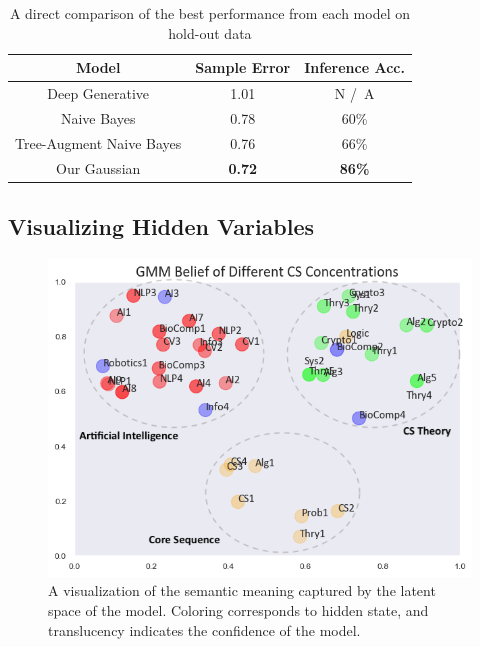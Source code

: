 \documentclass{edm_template}
\begin{document}
\begin{table}
    \centering
    \begin{tabular}{|c|c|c|}
    \hline
    Model & Sample Error & Inference Acc. \\
    \hline
    Deep Generative & 1.01 & N /\ A \\
    Naive Bayes & 0.78 & 60\% \\
    Tree-Augment Naive Bayes & 0.76 & 66\% \\
    Our Gaussian & \textbf{0.72} & \textbf{86\%}\\
    \hline
    \end{tabular}
    \caption{A direct comparison of the best performance from each model on hold-out data}
    \label{tab:kl_table}
\end{table}

\subsection{Visualizing Hidden Variables}


\begin{figure}[h]
    \centering
    \includegraphics[scale=0.5]{figures/gmm_clusters.png}
    \caption{A visualization of the semantic meaning captured by the latent space of the model. Coloring corresponds to hidden state, and translucency indicates the confidence of the model.}
    \label{fig:gmm_clusters}
\end{figure}
\end{document}
